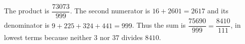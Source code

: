 The product is $\dfrac{73073}{999}$. The second numerator is $16+2601=2617$ and its denominator is $9+225+324+441=999$. Thus the sum is $\dfrac{75690}{999}=\boxed{\dfrac{8410}{111}}$, in lowest terms because neither $3$ nor $37$ divides $8410$.
